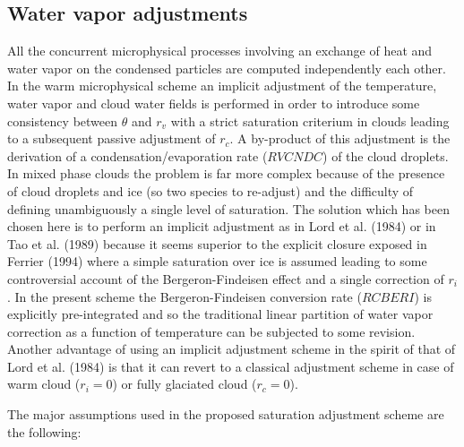 \subsection{Water vapor adjustments}\label{VAPADJ}
%
All the concurrent microphysical processes involving an exchange of heat and
water vapor on the condensed particles are computed independently each other.
In the warm microphysical scheme an implicit adjustment of the temperature,
water vapor and cloud water fields is performed in order to introduce some
consistency between $\theta$ and $r_v$ with a strict saturation criterium in
clouds leading to a subsequent passive adjustment of $r_c$. A by-product of this
adjustment is the derivation of a condensation/evaporation rate ($RVCNDC$) of
the cloud droplets. In mixed phase clouds the problem is far more complex
because of the presence of cloud droplets and ice (so two species to re-adjust)
and the difficulty of defining unambiguously a single level of saturation. The
solution which has been chosen here is to perform an implicit adjustment as in
Lord et al. (1984) or in Tao et al. (1989) because it seems superior to the
explicit closure exposed in Ferrier (1994) where a simple saturation over ice
is assumed leading to some controversial account of the Bergeron-Findeisen
effect\footnotemark
%
%
and a single correction of $r_i$. In the present scheme
the Bergeron-Findeisen conversion rate ($RCBERI$) is explicitly pre-integrated
and so the traditional linear partition of water vapor correction as a function
of temperature can be subjected to some revision. Another advantage of using an
implicit adjustment scheme in the spirit of that of Lord et al. (1984) is that
it can revert to a classical adjustment
scheme in case of warm cloud ($r_i=0$) or fully glaciated cloud ($r_c=0$).

The major assumptions used in the proposed saturation adjustment scheme are the
following:

